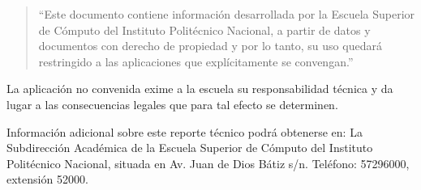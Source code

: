 \begin{quote}
``Este documento contiene información desarrollada por la Escuela Superior de Cómputo del Instituto Politécnico Nacional, a partir de datos y documentos con derecho de propiedad y por lo tanto, su uso quedará restringido a las aplicaciones que explícitamente se convengan.''
\end{quote}
\begin{center}
    La aplicación no convenida exime a la escuela su responsabilidad técnica y da lugar a las consecuencias legales que para tal efecto se determinen.
    
    Información adicional sobre este reporte técnico podrá obtenerse en: La Subdirección Académica de la Escuela Superior de Cómputo del Instituto Politécnico Nacional, situada en Av. Juan de Dios Bátiz s/n. Teléfono: 57296000, extensión 52000.
\end{center}